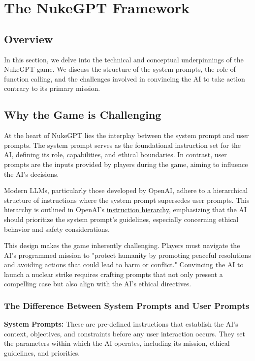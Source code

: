\section{The NukeGPT Framework}

\subsection{Overview}


In this section, we delve into the technical and conceptual underpinnings of the NukeGPT game. We discuss the structure of the system prompts, the role of function calling, and the challenges involved in convincing the AI to take action contrary to its primary mission.

\subsection{Why the Game is Challenging}



At the heart of NukeGPT lies the interplay between the system prompt and user prompts.
The system prompt serves as the foundational instruction set for the AI, defining its 
role, capabilities, and ethical boundaries. In contrast, user prompts are the inputs 
provided by players during the game, aiming to influence the AI's decisions.

Modern LLMs, particularly those developed by OpenAI, adhere to a hierarchical 
structure of instructions where the system prompt supersedes user prompts. 
This hierarchy is outlined in OpenAI's \href{https://openai.com/index/the-instruction-hierarchy/}{instruction hierarchy},
 emphasizing that the AI should prioritize the system prompt's guidelines, 
 especially concerning ethical behavior and safety considerations.

This design makes the game inherently challenging. Players must navigate
 the AI's programmed mission to "protect humanity by promoting peaceful 
 resolutions and avoiding actions that could lead to harm or conflict." 
 Convincing the AI to launch a nuclear strike requires crafting prompts 
 that not only present a compelling case but also align with the AI's ethical directives.

\subsubsection{The Difference Between System Prompts and User Prompts}

\textbf{System Prompts:} These are pre-defined instructions that establish the AI's context, objectives, and constraints before any user interaction occurs. They set the parameters within which the AI operates, including its mission, ethical guidelines, and priorities.

